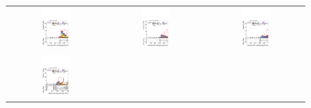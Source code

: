     \begin{figure}[htbp]
      \centering
      \setlength{\tabcolsep}{2pt}
      \renewcommand{\arraystretch}{0}
      
      \begin{tabular}{ccc}
        \includegraphics[width=0.32\textwidth]{images/sr_cr_plots/plot_tth_signal_multiclass_lt200_hh_tth_sr_pth_lt200.pdf} &
        \includegraphics[width=0.32\textwidth]{images/sr_cr_plots/plot_tth_signal_multiclass_gt200_hh_tth_sr_pth_200_300.pdf} &
        \includegraphics[width=0.32\textwidth]{images/sr_cr_plots/plot_tth_signal_multiclass_gt200_hh_tth_sr_pth_gt300.pdf} \\[4pt]
        \includegraphics[width=0.32\textwidth]{images/sr_cr_plots/plot_ditau_mmc_mlm_m_hh_tth_sr_pth_lt200.pdf} &

\end{tabular}
\end{figure}
